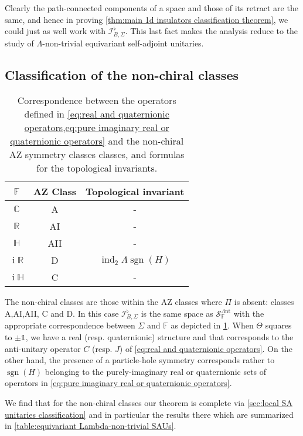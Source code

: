 \documentclass[a4paper,10pt]{article}
\numberwithin{equation}{section}
\theoremstyle{plain}
\theoremstyle{plain}
\theoremstyle{plain}
\theoremstyle{plain}
\theoremstyle{plain}
\theoremstyle{remark}
\theoremstyle{definition}
\theoremstyle{plain}
\newcommand{\ii}{\operatorname{i}}
\newcommand{\RR}{\mathbb{R}}
\newcommand{\CC}{\mathbb{C}}
\newcommand{\FF}{\mathbb{F}}
\newcommand{\calSU}{\mathcal{S}}
\newcommand{\calI}{\mathcal{I}}
\newcommand{\bbLambda}{\mathbb{\Lambda}}
\newcommand{\LamNT}{\Lambda\mathrm{nt}}
\newcommand{\LamNTSAU}{\calSU^{\LamNT}}
\newcommand{\Id}{\mathds{1}}
\newcommand{\HH}{\mathbb{H}}
\newcommand{\sgn}{\operatorname{sgn}}
\newcommand{\findex}{\operatorname{ind}}
\begin{document}
	Clearly the path-connected components of a space and those of its retract are the same, and hence in proving \cref{thm:main 1d insulators classification theorem}, we could just as well work with $\calI^\flat_{B,\Sigma}$. This last fact makes the analysis reduce to the study of $\Lambda$-non-trivial equivariant self-adjoint unitaries.
	
	\subsection{Classification of the non-chiral classes} 
	\begin{table}
		\begin{center}
			\begin{tabular}{|c|c|c|}
				\hline
				$\FF$ & AZ Class 
				& Topological invariant\\\hline\hline
				$\CC$ & A & - \\\hline
				$\RR$ & AI & -\\\hline
				$\HH$ & AII & - \\\hline
				$\ii\RR$ & D & $\findex_2 \bbLambda \sgn(H)$\\\hline
				$\ii\HH$ & C & -\\
				\hline
			\end{tabular}
		\end{center}
		\caption{Correspondence between the operators defined in \cref{eq:real and quaternionic operators,eq:pure imaginary real or quaternionic operators} and the non-chiral AZ symmetry classes classes, and formulas for the topological invariants.}
		\label{table:AZ non-chiral classes and symmetries of projections}
	\end{table}
	The non-chiral classes are those within the AZ classes where $\Pi$ is absent: classes A,AI,AII, C and D. In this case $\calI_{B,\Sigma}^\flat$ is the same space as $\LamNTSAU_\FF$ with the appropriate correspondence between $\Sigma$ and $\FF$ as depicted in \cref{table:AZ non-chiral classes and symmetries of projections}. When $\Theta$ squares to $\pm\Id$, we have a real (resp. quaternionic) structure and that corresponds to the anti-unitary operator $C$ (resp. $J$) of \cref{eq:real and quaternionic operators}. On the other hand, the presence of a particle-hole symmetry corresponds rather to $\sgn(H)$ belonging to the purely-imaginary real or quaternionic sets of operators in \cref{eq:pure imaginary real or quaternionic operators}.
	
	We find that for the non-chiral classes our theorem is complete via \cref{sec:local SA unitaries classification} and in particular the results there which are summarized in \cref{table:equivariant Lambda-non-trivial SAUs}.
	
\end{document}
